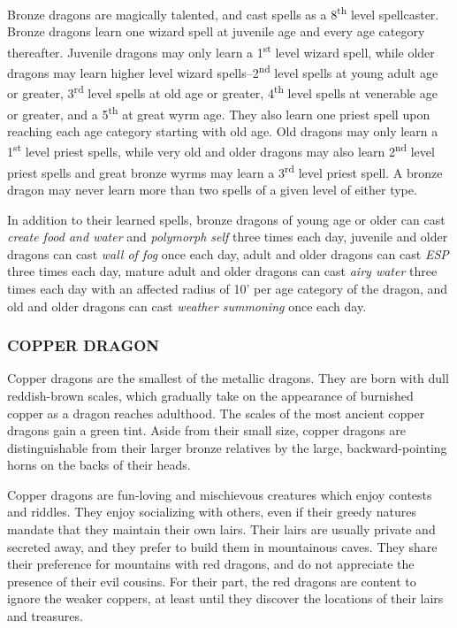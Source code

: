 \begin{multicols}{2}
Bronze dragons are magically talented, and cast spells as a 8\textsuperscript{th} level spellcaster. Bronze dragons learn one wizard spell at juvenile age and every age category thereafter. Juvenile dragons may only learn a 1\textsuperscript{st} level wizard spell, while older dragons may learn higher level wizard spells--2\textsuperscript{nd} level spells at young adult age or greater, 3\textsuperscript{rd} level spells at old age or greater, 4\textsuperscript{th} level spells at venerable age or greater, and a 5\textsuperscript{th} at great wyrm age. They also learn one priest spell upon reaching each age category starting with old age. Old dragons may only learn a 1\textsuperscript{st} level priest spells, while very old and older dragons may also learn 2\textsuperscript{nd} level priest spells and great bronze wyrms may learn a 3\textsuperscript{rd} level priest spell. A bronze dragon may never learn more than two spells of a given level of either type.

In addition to their learned spells, bronze dragons of young age or older can cast \textit{create food and water} and \textit{polymorph self} three times each day, juvenile and older dragons can cast \textit{wall of fog} once each day, adult and older dragons can cast \textit{ESP} three times each day, mature adult and older dragons can cast \textit{airy water} three times each day with an affected radius of 10' per age category of the dragon, and old and older dragons can cast \textit{weather summoning} once each day.

\subsubsection{COPPER DRAGON} 

Copper dragons are the smallest of the metallic dragons. They are born with dull reddish-brown scales, which gradually take on the appearance of burnished copper as a dragon reaches adulthood. The scales of the most ancient copper dragons gain a green tint. Aside from their small size, copper dragons are distinguishable from their larger bronze relatives by the large, backward-pointing horns on the backs of their heads.

Copper dragons are fun-loving and mischievous creatures which enjoy contests and riddles. They enjoy socializing with others, even if their greedy natures mandate that they maintain their own lairs. Their lairs are usually private and secreted away, and they prefer to build them in mountainous caves. They share their preference for mountains with red dragons, and do not appreciate the presence of their evil cousins. For their part, the red dragons are content to ignore the weaker coppers, at least until they discover the locations of their lairs and treasures.


\end{multicols}
